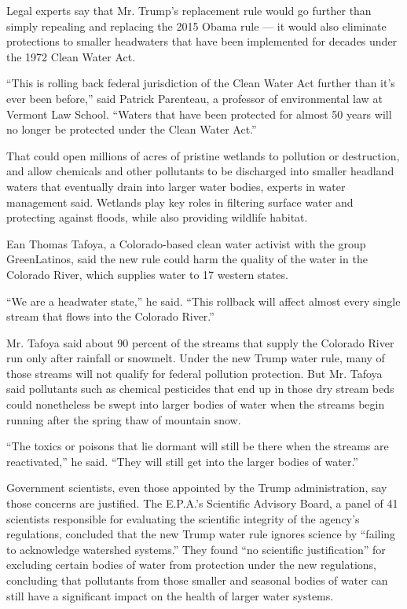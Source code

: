 Legal experts say that Mr. Trump's replacement rule would go further
than simply repealing and replacing the 2015 Obama rule --- it would
also eliminate protections to smaller headwaters that have been
implemented for decades under the 1972 Clean Water Act.

``This is rolling back federal jurisdiction of the Clean Water Act
further than it's ever been before,'' said Patrick Parenteau, a
professor of environmental law at Vermont Law School. ``Waters that have
been protected for almost 50 years will no longer be protected under the
Clean Water Act.''

That could open millions of acres of pristine wetlands to pollution or
destruction, and allow chemicals and other pollutants to be discharged
into smaller headland waters that eventually drain into larger water
bodies, experts in water management said. Wetlands play key roles in
filtering surface water and protecting against floods, while also
providing wildlife habitat.

Ean Thomas Tafoya, a Colorado-based clean water activist with the group
GreenLatinos, said the new rule could harm the quality of the water in
the Colorado River, which supplies water to 17 western states.

``We are a headwater state,'' he said. ``This rollback will affect
almost every single stream that flows into the Colorado River.''

Mr. Tafoya said about 90 percent of the streams that supply the Colorado
River run only after rainfall or snowmelt. Under the new Trump water
rule, many of those streams will not qualify for federal pollution
protection. But Mr. Tafoya said pollutants such as chemical pesticides
that end up in those dry stream beds could nonetheless be swept into
larger bodies of water when the streams begin running after the spring
thaw of mountain snow.

``The toxics or poisons that lie dormant will still be there when the
streams are reactivated,'' he said. ``They will still get into the
larger bodies of water.''

Government scientists, even those appointed by the Trump administration,
say those concerns are justified. The E.P.A.'s Scientific Advisory
Board, a panel of 41 scientists responsible for evaluating the
scientific integrity of the agency's regulations, concluded that the new
Trump water rule ignores science by ``failing to acknowledge watershed
systems.'' They found ``no scientific justification'' for excluding
certain bodies of water from protection under the new regulations,
concluding that pollutants from those smaller and seasonal bodies of
water can still have a significant impact on the health of larger water
systems.

